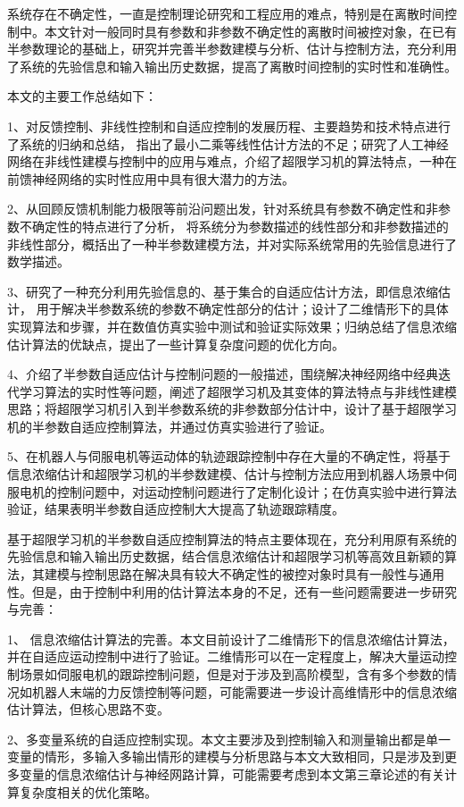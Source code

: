 
\begin{conclusion}
系统存在不确定性，一直是控制理论研究和工程应用的难点，特别是在离散时间控制中。本文针对一般同时具有参数和非参数不确定性的离散时间被控对象，在已有半参数理论的基础上，研究并完善半参数建模与分析、估计与控制方法，充分利用了系统的先验信息和输入输出历史数据，提高了离散时间控制的实时性和准确性。

本文的主要工作总结如下：

1、对反馈控制、非线性控制和自适应控制的发展历程、主要趋势和技术特点进行了系统的归纳和总结，
指出了最小二乘等线性估计方法的不足；研究了人工神经网络在非线性建模与控制中的应用与难点，介绍了超限学习机的算法特点，一种在前馈神经网络的实时性应用中具有很大潜力的方法。

2、从回顾反馈机制能力极限等前沿问题出发，针对系统具有参数不确定性和非参数不确定性的特点进行了分析，
将系统分为参数描述的线性部分和非参数描述的非线性部分，概括出了一种半参数建模方法，并对实际系统常用的先验信息进行了数学描述。

3、研究了一种充分利用先验信息的、基于集合的自适应估计方法，即信息浓缩估计，
用于解决半参数系统的参数不确定性部分的估计；设计了二维情形下的具体实现算法和步骤，并在数值仿真实验中测试和验证实际效果；归纳总结了信息浓缩估计算法的优缺点，提出了一些计算复杂度问题的优化方向。

4、介绍了半参数自适应估计与控制问题的一般描述，围绕解决神经网络中经典迭代学习算法的实时性等问题，阐述了超限学习机及其变体的算法特点与非线性建模思路；将超限学习机引入到半参数系统的非参数部分估计中，设计了基于超限学习机的半参数自适应控制算法，并通过仿真实验进行了验证。

5、在机器人与伺服电机等运动体的轨迹跟踪控制中存在大量的不确定性，将基于信息浓缩估计和超限学习机的半参数建模、估计与控制方法应用到机器人场景中伺服电机的控制问题中，对运动控制问题进行了定制化设计；在仿真实验中进行算法验证，结果表明半参数自适应控制大大提高了轨迹跟踪精度。

基于超限学习机的半参数自适应控制算法的特点主要体现在，充分利用原有系统的先验信息和输入输出历史数据，结合信息浓缩估计和超限学习机等高效且新颖的算法，其建模与控制思路在解决具有较大不确定性的被控对象时具有一般性与通用性。但是，由于控制中利用的估计算法本身的不足，还有一些问题需要进一步研究与完善：

1、 信息浓缩估计算法的完善。本文目前设计了二维情形下的信息浓缩估计算法，并在自适应运动控制中进行了验证。二维情形可以在一定程度上，解决大量运动控制场景如伺服电机的跟踪控制问题，但是对于涉及到高阶模型，含有多个参数的情况如机器人末端的力反馈控制等问题，可能需要进一步设计高维情形中的信息浓缩估计算法，但核心思路不变。

2、多变量系统的自适应控制实现。本文主要涉及到控制输入和测量输出都是单一变量的情形，多输入多输出情形的建模与分析思路与本文大致相同，只是涉及到更多变量的信息浓缩估计与神经网路计算，可能需要考虑到本文第三章论述的有关计算复杂度相关的优化策略。

\end{conclusion}